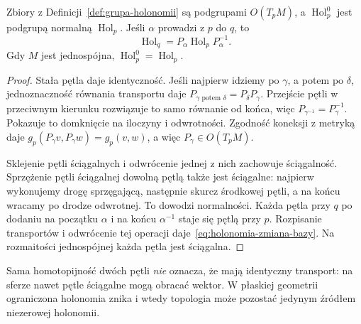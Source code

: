 \begin{stwierdzenie}
\label{prop:holonomia-grupa-baza}
Zbiory z Definicji~\ref{def:grupa-holonomii} są podgrupami
$O(T_pM)$, a $\operatorname{Hol}^0_p$ jest podgrupą
normalną $\operatorname{Hol}_p$. Jeśli $\alpha$ prowadzi
z $p$ do $q$, to
\begin{equation}\label{eq:holonomia-zmiana-bazy}
 \operatorname{Hol}_q=P_\alpha\operatorname{Hol}_pP_\alpha^{-1}.
\end{equation}
Gdy $M$ jest jednospójna, $\operatorname{Hol}^0_p=
\operatorname{Hol}_p$.
\end{stwierdzenie}
\begin{proof}
Stała pętla daje identyczność. Jeśli najpierw idziemy po
$\gamma$, a potem po $\delta$, jednoznaczność równania
transportu daje $P_{\gamma\text{ potem }\delta}
=P_\delta P_\gamma$. Przejście pętli w przeciwnym kierunku
rozwiązuje to samo równanie od końca, więc
$P_{\gamma^{-1}}=P_\gamma^{-1}$. Pokazuje to domknięcie
na iloczyny i odwrotności. Zgodność koneksji z metryką
daje $g_p(P_\gamma v,P_\gamma w)=g_p(v,w)$, a więc
$P_\gamma\in O(T_pM)$.

Sklejenie pętli ściągalnych i odwrócenie jednej z nich
zachowuje ściągalność. Sprzężenie pętli ściągalnej
dowolną pętlą także jest ściągalne: najpierw wykonujemy
drogę sprzęgającą, następnie skurcz środkowej pętli,
a na końcu wracamy po drodze odwrotnej. To dowodzi
normalności. Każda pętla przy $q$ po dodaniu na początku
$\alpha$ i na końcu $\alpha^{-1}$ staje się pętlą
przy $p$. Rozpisanie transportów i odwrócenie tej
operacji daje~\eqref{eq:holonomia-zmiana-bazy}.
Na rozmaitości jednospójnej każda pętla jest ściągalna.
\end{proof}

Sama homotopijność dwóch pętli \emph{nie} oznacza, że
mają identyczny transport: na sferze nawet pętle
ściągalne mogą obracać wektor. W płaskiej geometrii
ograniczona holonomia znika i wtedy topologia może
pozostać jedynym źródłem niezerowej holonomii.

